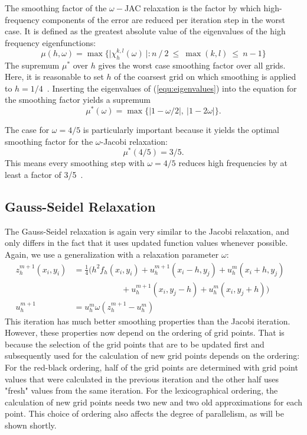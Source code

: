 The smoothing factor of the $\omega-$JAC relaxation is the factor by which high-frequency components of the error are reduced per iteration step in the worst case. It is defined as the greatest absolute value of the eigenvalues of the high frequency eigenfunctions:
\begin{equation}
\mu (h,\omega) = \max \Big\{\Big|\chi_h^{k,l}(\omega)~\Big|: n~/~2 ~\leq ~\max(k,l) ~\leq ~n-1 \Big\} 
\end{equation}
The supremum $\mu^*$ over $h$  gives the worst case smoothing factor over all grids. Here, it is reasonable to set $h$ of the coarsest grid on which smoothing is applied to $h = 1/4$~\cite{Trottenberg:2000:MUL:374106}. Inserting the eigenvalues of (\ref{equ:eigenvalues}) into the equation for the smoothing factor yields a supremum 
\begin{equation}
\mu^* (\omega) = \max \big\{\big|1-\omega/2\big|,~\big|1-2\omega\big| \big\}.
\end{equation}


The case for $\omega = 4/5$ is particularly important because it yields the optimal smoothing factor for the $\omega$-Jacobi relaxation:
\begin{equation}
\mu^*(4/5) = 3/5.
\end{equation}
This means every smoothing step with $\omega = 4/5$ reduces high frequencies by at least a factor of 3/5~\cite{Trottenberg:2000:MUL:374106}.

\subsection{Gauss-Seidel Relaxation}
The Gauss-Seidel relaxation is again very similar to the Jacobi relaxation, and only differs in the fact that it uses updated function values whenever possible. Again, we use a generalization with a relaxation parameter $\omega$:
\begin{align}
z_h^{m+1}(x_i, y_i)&= \frac{1}{4} \Big ( h^2 f_h(x_i, y_i) + u_h^{m+1}(x_i-h, y_j) + u_h^m(x_i+h, y_j) \nonumber \\
                  &~~~~~~~~~~~~~~~~~~~~~~~~~~+ u_h^{m+1}(x_i, y_j-h) + u_h^m(x_i,y_j+h) \Big ) \\
        u_h^{m+1} &= u_h^m \omega (z_h^{m+1} - u_h^m) & \nonumber
\end{align}
This iteration has much better smoothing properties than the Jacobi iteration. However, these properties now depend on the ordering of grid points. That is because the selection of the grid points that are to be updated first and subsequently used for the calculation of new grid points depends on the ordering: For the red-black ordering, half of the grid points are determined with grid point values that were calculated in the previous iteration and the other half uses "fresh" values from the same iteration. For the lexicographical ordering, the calculation of new grid points needs two new and two old approximations for each point. This choice of ordering also affects the degree of parallelism, as will be shown shortly. 

